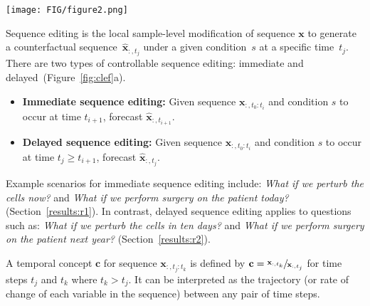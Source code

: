 \begin{figure*}[ht]
\begin{center}
\centerline{\texttt{[image: FIG/figure2.png]}}
\caption{Overview of \name's architecture and capabilities. \textbf{(a)}~Given an input sequence, forecast time, and condition embedding from a frozen pretrained~(\textsc{pt}) embedding model, \name generates a counterfactual sequence via immediate or delayed sequence editing. \textbf{(b)}~\name is composed of a sequence encoder, condition adapter, concept encoder, and concept decoder. \name has two key capabilities: \textbf{(c)}~forecasting counterfactual sequences at any time in the future and under any condition~(e.g.,~medical codes), and \textbf{(d)}~generating counterfactual sequences by intervening on \name's learned temporal concepts.}
\label{fig:clef}
\end{center}
\vskip -0.35in
\end{figure*}



\begin{definition}
\label{def:cse}
Sequence editing is the local sample-level modification of sequence $\mathbf{x}$ to generate a counterfactual sequence~$\hat{\mathbf{x}}_{:,t_j}$ under a given condition~$s$ at a specific time~$t_j$. There are two types of controllable sequence editing: immediate and delayed~(Figure~\ref{fig:clef}a).
\begin{itemize}[leftmargin=*,noitemsep,topsep=0pt]
    \item \textbf{Immediate sequence editing:} Given sequence $\mathbf{x}_{:,t_0:t_i}$ and condition $s$ to occur at time $t_{i + 1}$, forecast $\hat{\mathbf{x}}_{:,t_{i + 1}}$.
    \item \textbf{Delayed sequence editing:} Given sequence $\mathbf{x}_{:,t_0:t_i}$ and condition $s$ to occur at time $t_j \geq t_{i + 1}$, forecast $\hat{\mathbf{x}}_{:,t_j}$.
\end{itemize}
\end{definition}
%
Example scenarios for immediate sequence editing include: \textit{What if we perturb the cells now?} and \textit{What if we perform surgery on the patient today?} (Section~\ref{results:r1}). In contrast, delayed sequence editing applies to questions such as: \textit{What if we perturb the cells in ten days?} and \textit{What if we perform surgery on the patient next year?} (Section~\ref{results:r2}).

\begin{definition}\label{def:concept}
A temporal concept $\mathbf{c}$ for sequence $\mathbf{x}_{:,t_j:t_k}$ is defined by $\displaystyle \mathbf{c} = \sfrac{\mathbf{x}_{:,t_k}}{\mathbf{x}_{:,t_j}}$ for time steps $t_j$ and $t_k$ where $t_k > t_j$. It can be interpreted as the trajectory (or rate of change of each variable in the sequence) between any pair of time steps.
\end{definition}


